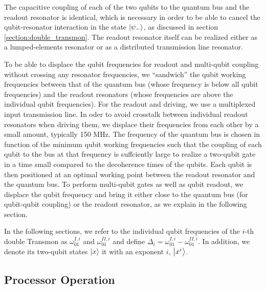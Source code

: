 The capacitive coupling of each of the two qubits to the quantum bus and the readout resonator is identical, which is necessary in order to be able to cancel the qubit-resonator interaction in the state $\left| \psi_- \right>$, as discussed in section \ref{section:double_transmon}. The readout resonator itself can be realized either as a lumped-elements resonator or as a distributed transmission line resonator.

\smallskip

To be able to displace the qubit frequencies for readout and multi-qubit coupling without crossing any resonator frequencies, we ``sandwich'' the qubit working frequencies between that of the quantum bus (whose frequency is below all qubit frequencies) and the readout resonators (whose frequencies are above the individual qubit frequencies). For the readout and driving, we use a multiplexed input transmission line. In oder to avoid crosstalk between individual readout resonators when driving them, we displace their frequencies from each other by a small amount, typically 150 MHz. The frequency of the quantum bus is chosen in function of the minimum qubit working frequencies such that the coupling of each qubit to the bus at that frequency is suffciently large to realize a two-qubit gate in a time small compared to the decoherence times of the qubits. Each qubit is then positioned at an optimal working point between the readout resonator and the quantum bus. To perform multi-qubit gates as well as qubit readout, we displace the qubit frequency and bring it either close to the quantum bus (for qubit-qubit coupling) or the readout resonator, as we explain in the following section.

\smallskip

In the following sections, we refer to the individual qubit frequencies of the $i$-th double Transmon as $\omega_{01}^{I,i}$ and $\omega_{01}^{II,i}$ and define $\Delta_i = \omega_{01}^{I,i}-\omega_{01}^{II,i}$. In addition, we denote its two-qubit states $\left| x \right>$ it with an exponent $i$, $\left| x^i \right>$.

\subsection{Processor Operation}

